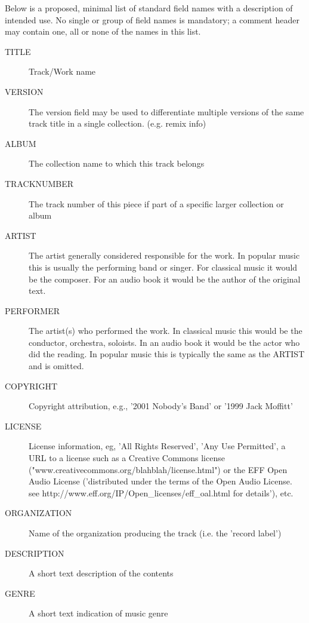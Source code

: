 Below is a proposed, minimal list of standard field names with a
description of intended use.  No single or group of field names is
mandatory; a comment header may contain one, all or none of the names
in this list.

\begin{description} %
\item[TITLE]
	Track/Work name

\item[VERSION]
	The version field may be used to differentiate multiple
versions of the same track title in a single collection. (e.g. remix
info)

\item[ALBUM]
	The collection name to which this track belongs

\item[TRACKNUMBER]
	The track number of this piece if part of a specific larger collection or album

\item[ARTIST]
	The artist generally considered responsible for the work. In popular music this is usually the performing band or singer. For classical music it would be the composer. For an audio book it would be the author of the original text.

\item[PERFORMER]
	The artist(s) who performed the work. In classical music this would be the conductor, orchestra, soloists. In an audio book it would be the actor who did the reading. In popular music this is typically the same as the ARTIST and is omitted.

\item[COPYRIGHT]
	Copyright attribution, e.g., '2001 Nobody's Band' or '1999 Jack Moffitt'

\item[LICENSE]
	License information, eg, 'All Rights Reserved', 'Any
Use Permitted', a URL to a license such as a Creative Commons license
("www.creativecommons.org/blahblah/license.html") or the EFF Open
Audio License ('distributed under the terms of the Open Audio
License. see http://www.eff.org/IP/Open\_licenses/eff\_oal.html for
details'), etc.

\item[ORGANIZATION]
	Name of the organization producing the track (i.e.
the 'record label')

\item[DESCRIPTION]
	A short text description of the contents

\item[GENRE]
	A short text indication of music genre


\end{description}
